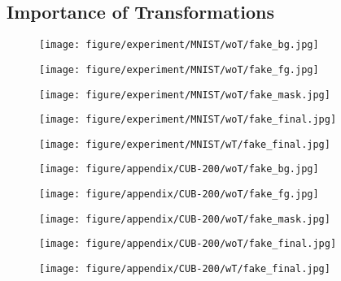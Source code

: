 \documentclass{article} \usepackage{iclr2017_conference,times}
\begin{document}
 \subsection{Importance of Transformations}
\label{sec:transformation}
\begin{figure}[h]
\begin{minipage}{0.195\linewidth}
\center
\texttt{[image: figure/experiment/MNIST/woT/fake\_bg.jpg]}
\end{minipage}
\begin{minipage}{0.195\linewidth}
\center
\texttt{[image: figure/experiment/MNIST/woT/fake\_fg.jpg]}
\end{minipage}
\begin{minipage}{0.195\linewidth}
\center
\texttt{[image: figure/experiment/MNIST/woT/fake\_mask.jpg]}
\end{minipage}
\begin{minipage}{0.195\linewidth}
\center
\texttt{[image: figure/experiment/MNIST/woT/fake\_final.jpg]}
\end{minipage}
\begin{minipage}{0.195\linewidth}
\center
\texttt{[image: figure/experiment/MNIST/wT/fake\_final.jpg]}
\end{minipage}

\begin{minipage}{0.195\linewidth}
\center
\texttt{[image: figure/appendix/CUB-200/woT/fake\_bg.jpg]}
\end{minipage}
\begin{minipage}{0.195\linewidth}
\center
\texttt{[image: figure/appendix/CUB-200/woT/fake\_fg.jpg]}
\end{minipage}
\begin{minipage}{0.195\linewidth}
\center
\texttt{[image: figure/appendix/CUB-200/woT/fake\_mask.jpg]}
\end{minipage}
\begin{minipage}{0.195\linewidth}
\center
\texttt{[image: figure/appendix/CUB-200/woT/fake\_final.jpg]}
\end{minipage}
\begin{minipage}{0.195\linewidth}
\center
\texttt{[image: figure/appendix/CUB-200/wT/fake\_final.jpg]}
\end{minipage}


\end{figure}
\end{document}

